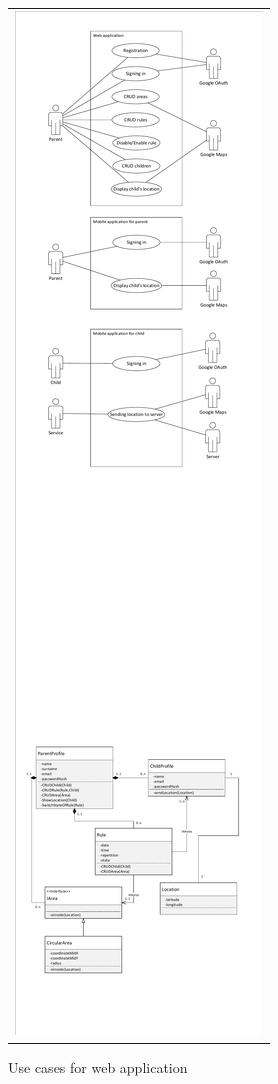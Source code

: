 \documentclass{sprawozdanie-agh}
\begin{document}
		\begin{figure}[H]
			\centering
			\begin{tabular}{c}
				\includegraphics[width=.80\textwidth]{webUseCase} 
			\end{tabular} 
		\caption{Use cases for web application}
		\end{figure}
\end{document}
